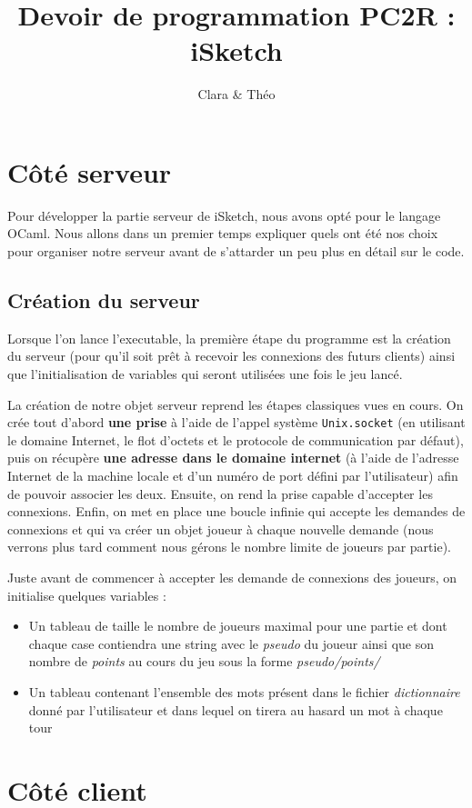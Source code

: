 \documentclass[a4paper, 11pt]{article}
\title{Devoir de programmation PC2R : iSketch}
\author{Clara \bsc{Muller} \& Théo \bsc{Lebourg}}
\date{}
\begin{document}
\maketitle

\section{Côté serveur}
Pour développer la partie serveur de iSketch, nous avons opté pour le
langage OCaml. Nous allons dans un premier temps expliquer quels ont
été nos choix pour organiser notre serveur avant de s’attarder un peu
plus en détail sur le code.

\subsection {Création du serveur}
Lorsque l'on lance l’executable, la première étape du programme est la
création du serveur (pour qu’il soit prêt à recevoir les connexions
des futurs clients) ainsi que l’initialisation de variables qui seront
utilisées une fois le jeu lancé.

\bigskip La création de notre objet serveur reprend les étapes
classiques vues en cours. On crée tout d’abord \textbf{une prise} à
l’aide de l’appel système \verb+Unix.socket+ (en utilisant le domaine
Internet, le flot d’octets et le protocole de communication par
défaut), puis on récupère \textbf{une adresse dans le domaine
  internet} (à l’aide de l’adresse Internet de la machine locale et
d’un numéro de port défini par l’utilisateur) afin de pouvoir associer
les deux. Ensuite, on rend la prise capable d’accepter les
connexions. Enfin, on met en place une boucle infinie qui accepte les
demandes de connexions et qui va créer un objet joueur à chaque
nouvelle demande (nous verrons plus tard comment nous gérons le nombre
limite de joueurs par partie).

\bigskip Juste avant de commencer à accepter les demande de connexions
des joueurs, on initialise quelques variables :
\begin{itemize}
\item Un tableau de taille le nombre de joueurs maximal pour une
  partie et dont chaque case contiendra une string avec le
  \textit{pseudo} du joueur ainsi que son nombre de \textit{points} au
  cours du jeu sous la forme \textit{pseudo/points/}
\item Un tableau contenant l’ensemble des mots présent dans le fichier
  \textit{dictionnaire} donné par l’utilisateur et dans lequel on
  tirera au hasard un mot à chaque tour
\end{itemize}


\section{Côté client}
\end{document}
